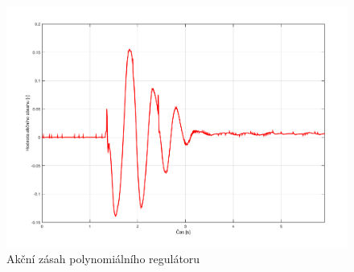 \documentclass[11pt,a4paper]{article}
\begin{document}
\begin{figure}[H]
	\centering
    \includegraphics[scale=0.55]{odezva_kyvadlo_poly_akcnizasah}
    \caption{Akční zásah polynomiálního regulátoru}
\end{figure}
\end{document}

